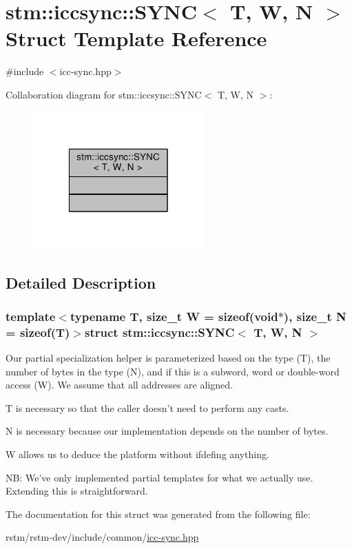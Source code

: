 \hypertarget{structstm_1_1iccsync_1_1SYNC}{\section{stm\-:\-:iccsync\-:\-:S\-Y\-N\-C$<$ T, W, N $>$ Struct Template Reference}
\label{structstm_1_1iccsync_1_1SYNC}
}


{\ttfamily \#include $<$icc-\/sync.\-hpp$>$}



Collaboration diagram for stm\-:\-:iccsync\-:\-:S\-Y\-N\-C$<$ T, W, N $>$\-:
\nopagebreak
\begin{figure}[H]
\begin{center}
\leavevmode
\includegraphics[width=186pt]{structstm_1_1iccsync_1_1SYNC__coll__graph}
\end{center}
\end{figure}


\subsection{Detailed Description}
\subsubsection*{template$<$typename T, size\-\_\-t W = sizeof(void$\ast$), size\-\_\-t N = sizeof(\-T)$>$struct stm\-::iccsync\-::\-S\-Y\-N\-C$<$ T, W, N $>$}

Our partial specialization helper is parameterized based on the type (T), the number of bytes in the type (N), and if this is a subword, word or double-\/word access (W). We assume that all addresses are aligned.

T is necessary so that the caller doesn't need to perform any casts.

N is necessary because our implementation depends on the number of bytes.

W allows us to deduce the platform without ifdefing anything.

N\-B\-: We've only implemented partial templates for what we actually use. Extending this is straightforward. 

The documentation for this struct was generated from the following file\-:\begin{DoxyCompactItemize}
\item 
rstm/rstm-\/dev/include/common/\hyperlink{icc-sync_8hpp}{icc-\/sync.\-hpp}\end{DoxyCompactItemize}
